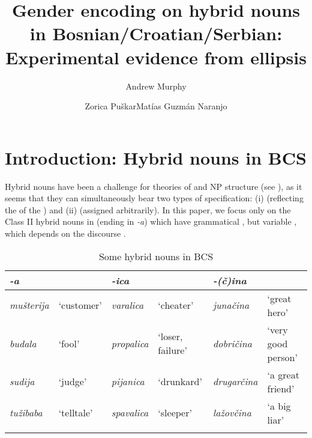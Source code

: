 \documentclass[output=paper,modfonts,newtxmath,hidelinks]{langscibook}
\title{Gender encoding on hybrid nouns in Bosnian\slash Croatian\slash Serbian: \newlineCover Experimental evidence from ellipsis}
\author{Andrew Murphy\affiliation{University of Leipzig}\and  Zorica Puškar\affiliation{Leibniz-Zentrum Allgemeine Sprachwissenschaft, Berlin}\lastand  Matías Guzmán Naranjo\affiliation{Heinrich Heine University Düsseldorf}}
\begin{document}
\maketitle
{}

\section{Introduction: Hybrid nouns in BCS}

Hybrid nouns have been a challenge for theories of  and NP structure (see \citealt{corbett91,wandz03,aandalfg,aandalanguage,pesetsky14,kramerbook,Landau2016DPinternalsemantic,smith15,smith16,arsenijevicjuksek,despichybrid17}), as it seems that they can simultaneously bear two types of  specification: 
(i)  (reflecting the  of the ) and
(ii)  (assigned arbitrarily). In this paper, we focus only on the Class II hybrid nouns in  (ending in \textit{-a}) which have grammatical  , but variable , which depends on the discourse .
	

\begin{table}
\caption{Some hybrid nouns in BCS}\label{14:t1}
\small
\begin{tabularx}{\textwidth}{llllll}
\lsptoprule
\textbf{\textit{-a}}&&\textbf{\textit{-ica}}&&\textbf{\textit{-(č)ina}}&\\
\midrule
\textit{mušterija} & `customer' &  \textit{varalica} & `cheater'  & \textit{junačina} & `great hero'\\  
\textit{budala} & `fool'  & \textit{propalica} & `loser, failure' & \textit{dobričina} & `very good person'\\
\textit{sudija} & `judge' & \textit{pijanica} & `drunkard'  & \textit{drugarčina} & `a great friend'\\
\textit{tužibaba} & `telltale' & \textit{spavalica} & `sleeper' & \textit{lažovčina} & `a big liar' \\
\lspbottomrule
\end{tabularx}
\end{table}
\end{document}
